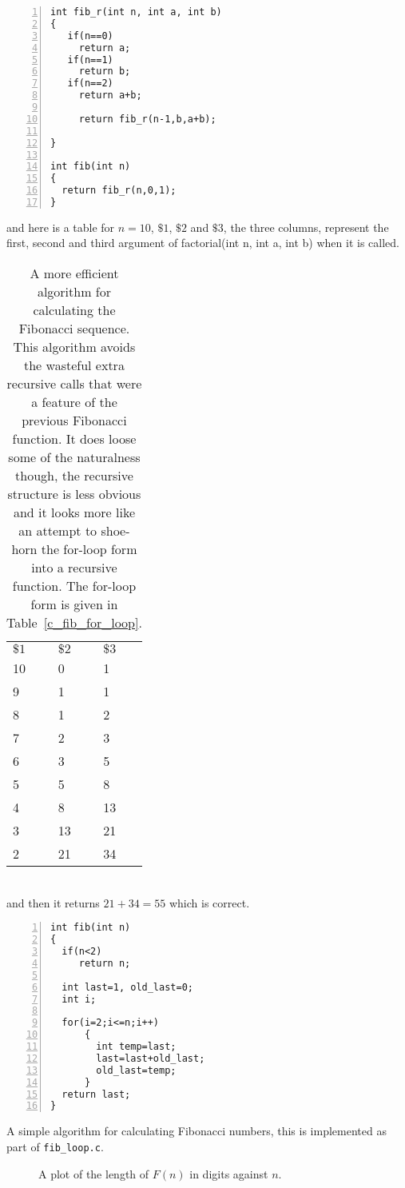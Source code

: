 \documentclass[11pt,a4paper]{scrartcl}
\begin{document}
\begin{table}
\begin{lstlisting}[numbers=left]
int fib_r(int n, int a, int b)
{
   if(n==0)
     return a;
   if(n==1)
     return b;
   if(n==2)
     return a+b;
     
     return fib_r(n-1,b,a+b);

}

int fib(int n)
{
  return fib_r(n,0,1);
}
\end{lstlisting}
and here is a table for $n=10$, $\$1$, $\$2$ and $\$3$, the three
columns, represent the first, second and third argument of
factorial(int n, int a, int b) when it is called.\\
\begin{tabular}{l|ll}
$\$1$&$\$2$&$\$3$\\
10&0&1\\
9 &1&1\\
8 &1&2\\
7 &2&3\\
6 &3&5\\
5 &5&8\\
4 &8&13\\
3 &13&21\\
2 &21&34\\
\end{tabular}\\
and then it returns $21+34=55$ which is correct.
\caption{A more efficient algorithm for calculating the Fibonacci
  sequence. This algorithm avoids the wasteful extra recursive calls
  that were a feature of the previous Fibonacci function. It does
  loose some of the naturalness though, the recursive structure is
  less obvious and it looks more like an attempt to shoe-horn the
  for-loop form into a recursive function. The for-loop form is given
  in Table~\ref{c_fib_for_loop}. \label{c_fib_good_recursion}}
\end{table}


\begin{table}
\begin{lstlisting}[numbers=left]
int fib(int n)
{
  if(n<2)
     return n;
  
  int last=1, old_last=0;
  int i;

  for(i=2;i<=n;i++)
      {
        int temp=last;
        last=last+old_last;
        old_last=temp;
      }
  return last;
}
\end{lstlisting}

\caption{A simple algorithm for calculating Fibonacci numbers, this is implemented as part of {\tt fib\_loop.c}. \label{c_fib_for_loop}}
\end{table}


\begin{figure}

\caption{A plot of the length of $F(n)$ in digits against $n$. \label{fig_fib_length}}
\end{figure}
\end{document}
